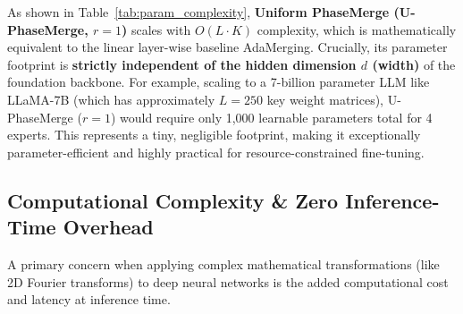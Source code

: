 \documentclass{article}
\theoremstyle{plain}
\theoremstyle{definition}
\theoremstyle{remark}
\begin{document}
\begin{table}[ht]
\caption{Parameter footprint and scaling complexity of various model-merging optimization methods as a function of model depth $L$, task count $K$, and hidden dimension $d$.}
\label{tab:param_complexity}
\vskip 0.15in
\begin{center}
\begin{small}
\end{small}
\end{center}
\vskip -0.1in
\end{table}

As shown in Table~\ref{tab:param_complexity}, \textbf{Uniform PhaseMerge (U-PhaseMerge, $r=1$)} scales with $O(L \cdot K)$ complexity, which is mathematically equivalent to the linear layer-wise baseline AdaMerging. Crucially, its parameter footprint is \textbf{strictly independent of the hidden dimension $d$ (width)} of the foundation backbone. For example, scaling to a 7-billion parameter LLM like LLaMA-7B (which has approximately $L = 250$ key weight matrices), U-PhaseMerge ($r=1$) would require only 1,000 learnable parameters total for 4 experts. This represents a tiny, negligible footprint, making it exceptionally parameter-efficient and highly practical for resource-constrained fine-tuning.

\subsection{Computational Complexity \& Zero Inference-Time Overhead}
A primary concern when applying complex mathematical transformations (like 2D Fourier transforms) to deep neural networks is the added computational cost and latency at inference time. 
\end{document}
